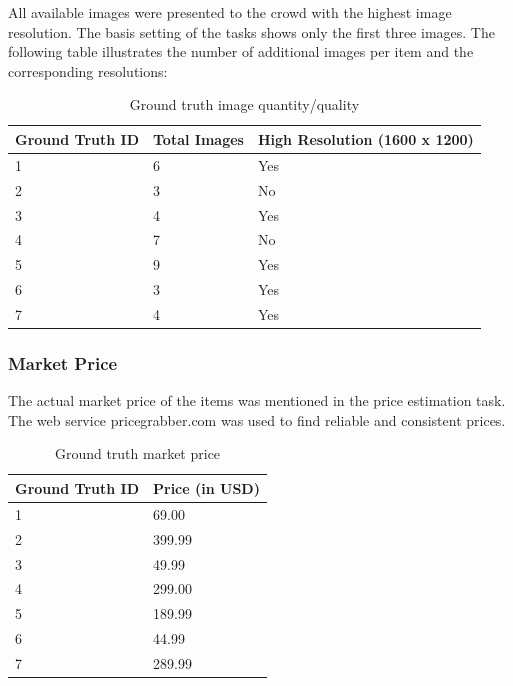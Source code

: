All available images were presented to the crowd with the highest image resolution. The basis setting of the tasks shows only the first three images. The following table illustrates the number of additional images per item and the corresponding resolutions: 
\begin{table}[h!]
	\begin{center}
	\begin{tabular}{| p{4.33cm} | p{4.33cm} | p{4.33cm} |}
		\hline
		Ground Truth ID & Total Images & High Resolution (1600 x 1200) \\
		\hline
		1 & 6 & Yes \\
		\hline
		2 & 3 & No \\
		\hline
		3 & 4 & Yes \\
		\hline
		4 & 7 & No \\
		\hline
		5 & 9 & Yes \\
		\hline
		6 & 3 & Yes \\
		\hline
		7 & 4 & Yes \\
		\hline
	\end{tabular}
	\end{center}
	\caption{Ground truth image quantity/quality}
\end{table}
\subsubsection{Market Price}
The actual market price of the items was mentioned in the price estimation task. The web service pricegrabber.com was used to find reliable and consistent prices. 
\begin{table}[h!]
	\begin{center}
	\begin{tabular}{| p{6.5cm} | p{6.5cm} |}
		\hline
		Ground Truth ID & Price (in USD) \\
		\hline
		1 & 69.00 \\
		\hline
		2 & 399.99 \\
		\hline
		3 & 49.99 \\
		\hline
		4 & 299.00 \\
		\hline
		5 & 189.99 \\
		\hline
		6 & 44.99 \\
		\hline
		7 & 289.99 \\
		\hline
	\end{tabular}
	\end{center}
	\caption{Ground truth market price}
\end{table}
